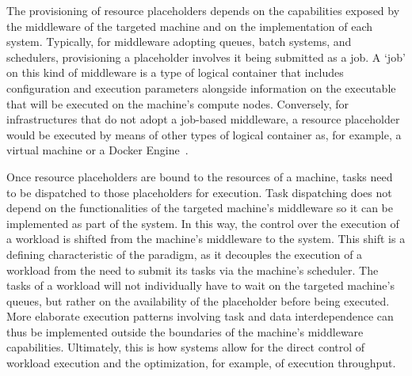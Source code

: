 \documentclass{sig-alternate}
\begin{document}

The provisioning of resource placeholders depends on the capabilities exposed by
the middleware of the targeted machine and on the implementation of each \pilot
system. Typically, for middleware adopting queues, batch systems, and
schedulers, provisioning a placeholder involves it being submitted as a job. A
`job' on this kind of middleware is a type of logical container that includes
configuration and execution parameters alongside information on the executable
that will be executed on the machine's compute nodes. Conversely, for
infrastructures that do not adopt a job-based middleware, a resource placeholder
would be executed by means of other types of logical container as, for example,
a virtual machine or a Docker Engine~\cite{bernstein2014,felter2014}.

Once resource placeholders are bound to the resources of a machine, tasks need
to be dispatched to those placeholders for execution. Task dispatching does not
depend on the functionalities of the targeted machine's middleware so it can be
implemented as part of the \pilotjob system. In this way, the control over the
execution of a workload is shifted from the machine's middleware to the \pilot
system. This shift is a defining characteristic of the \pilot paradigm, as it
decouples the execution of a workload from the need to submit its tasks via the
machine's scheduler. The tasks of a workload will not individually have to wait
on the targeted machine's queues, but rather on the availability of the
placeholder before being executed. More elaborate execution patterns involving
task and data interdependence can thus be implemented outside the boundaries of
the machine's middleware capabilities. Ultimately, this is how \pilotjob systems
allow for the direct control of workload execution and the optimization, for
example, of execution throughput.
\end{document}
